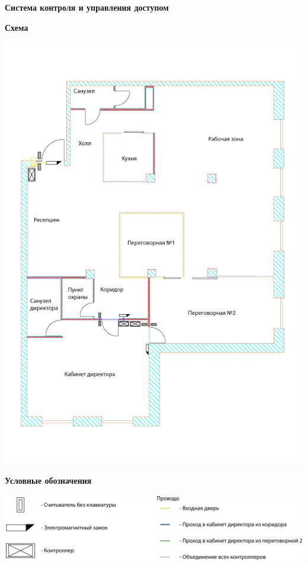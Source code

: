 \documentclass[a4paper,14pt]{extarticle}
\begin{document}
    \newpage
    \textbf{\large{Система контроля и управления доступом}}

    \begin{center}
        \textbf{Схема}
    \end{center}
    \vspace{-6ex}
    \begin{center}
        \includegraphics[scale=0.65]{pics/SCUD.png}
    \end{center}
    \textbf{Условные обозначения}
    \begin{center}
        \includegraphics[scale=0.65]{pics/SCUD(mark).png}
    \end{center}
\end{document}
